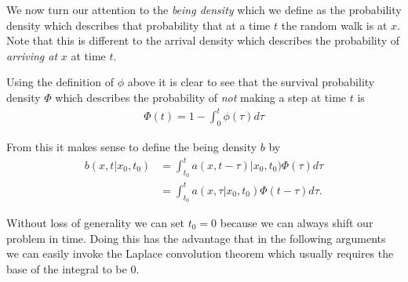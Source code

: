 We now turn our attention to the \emph{being density} which we define as the probability density which describes that probability that at a time $ t $ the random walk is at $ x $. Note that this is different to the arrival density which describes the probability of \emph{arriving at} $ x $ at time $ t $. 

Using the definition of $ \phi $ above it is clear to see that the survival probability density $ \Phi $ which describes the probability of \emph{not} making a step at time $ t $ is 
\begin{align}
    \label{eq:Phi_def}
    \Phi(t) = 1 - \int_0^t \phi(\tau) d\tau
\end{align}

From this it makes sense to define the being density $ b $ by
\begin{align}
    b(x,t|x_0,t_0) &= \int_{t_0}^t a(x,t-\tau)|x_0, t_0) \Phi(\tau)d\tau \\
    &= \int_{t_0}^t a(x,\tau|x_0,t_0)\Phi(t-\tau)d\tau.
\end{align}

Without loss of generality we can set $ t_0 = 0 $ because we can always shift our problem in time. Doing this has the advantage that in the following arguments we can easily invoke the Laplace convolution theorem which usually requires the base of the integral to be $ 0 $. 

